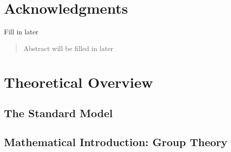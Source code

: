 \documentclass{umassthesis}          %
\begin{document}
\chapter{Acknowledgments}             %
  Fill in later

\begin{abstract}                %
    Abstract will be filled in later
\end{abstract}



\tableofcontents                %
\listoftables                   %
\listoffigures                  %


\mainmatter{}   %

\label{ch:introduction}


% 

\chapter{Theoretical Overview}\label{ch:theory}

\section{The Standard Model}\label{sec:sm}
\section{Mathematical Introduction: Group Theory}\label{sec:group_theory}
\end{document}
